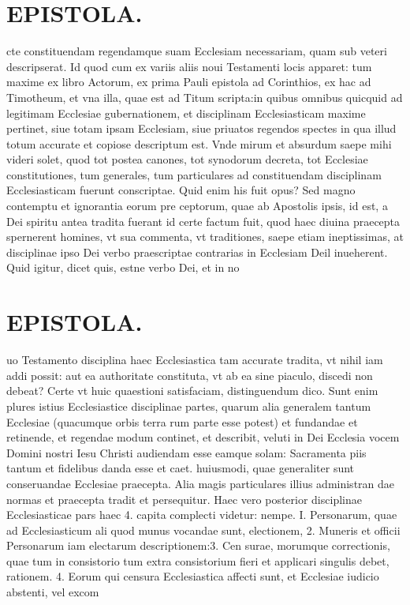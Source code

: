 \documentclass{article}
\begin{document}
\begin{pages}
\section*{EPISTOLA. }\pstart cte constituendam regendamque suam Ecclesiam necessariam, quam sub veteri descripserat. Id quod cum ex variis aliis noui Testamenti locis apparet: tum maxime ex libro Actorum, ex prima Pauli epistola ad Corinthios, ex hac ad Timotheum, et vna illa, quae est ad Titum scripta:in quibus omnibus quicquid ad legitimam Ecclesiae gubernationem, et disciplinam Ecclesiasticam maxime pertinet, siue totam ipsam Ecclesiam, siue priuatos regendos spectes in qua illud totum accurate et copiose descriptum est. Vnde mirum et absurdum saepe mihi videri solet, quod tot postea canones, tot synodorum decreta, tot Ecclesiae constitutiones, tum generales, tum particulares ad constituendam disciplinam Ecclesiasticam fuerunt conscriptae. Quid enim his fuit opus? Sed magno contemptu et ignorantia eorum pre ceptorum, quae ab Apostolis ipsis, id est, a Dei spiritu antea tradita fuerant id certe factum fuit, quod haec diuina praecepta spernerent homines, vt sua commenta, vt traditiones, saepe etiam ineptissimas, at disciplinae ipso Dei verbo praescriptae contrarias in Ecclesiam Deil inueherent. Quid igitur, dicet quis, estne verbo Dei, et in no\pend
\section*{EPISTOLA. }\pstart uo Testamento disciplina haec Ecclesiastica tam accurate tradita, vt nihil iam addi possit: aut ea authoritate constituta, vt ab ea sine piaculo, discedi non debeat? Certe vt huic quaestioni satisfaciam, distinguendum dico. Sunt enim plures istius Ecclesiastice disciplinae partes, quarum alia generalem tantum Ecclesiae (quacumque orbis terra rum parte esse potest) et fundandae et retinende, et regendae modum continet, et describit, veluti in Dei Ecclesia vocem Domini nostri Iesu Christi audiendam esse eamque solam: Sacramenta piis tantum et fidelibus danda esse et caet. huiusmodi, quae generaliter sunt conseruandae Ecclesiae praecepta. Alia magis particulares illius administran dae normas et praecepta tradit et persequitur. Haec vero posterior disciplinae Ecclesiasticae pars haec 4. capita complecti videtur: nempe. I. Personarum, quae ad Ecclesiasticum ali quod munus vocandae sunt, electionem, 2. Muneris et officii Personarum iam electarum descriptionem:3. Cen surae, morumque correctionis, quae tum in consistorio tum extra consistorium fieri et applicari singulis debet, rationem. 4. Eorum qui censura Ecclesiastica affecti sunt, et Ecclesiae iudicio abstenti, vel excom\pend

\end{pages}
\end{document}
